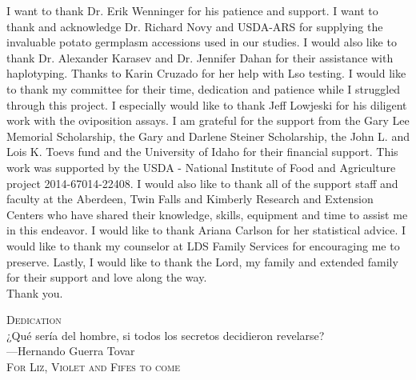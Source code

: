 \documentclass{UIdahoMastersThesis}
\begin{document}
	I want to thank Dr. Erik Wenninger for his patience and support. 
I want to thank and acknowledge Dr. Richard Novy and USDA-ARS for supplying the invaluable potato germplasm accessions used in our studies. I would also like to thank Dr. Alexander Karasev and Dr. Jennifer Dahan for their assistance with haplotyping. Thanks to Karin Cruzado for her help with Lso testing.  I would like to thank my committee for their time, dedication and patience while I struggled through this project. I especially would like to thank Jeff Lowjeski for his diligent work with the oviposition assays. I am grateful for the support from the Gary Lee Memorial Scholarship, the Gary and Darlene Steiner Scholarship, the John L. and Lois K. Toevs fund and the University of Idaho for their financial support. This work was supported by the USDA - National Institute of Food and Agriculture project 2014-67014-22408. I would also like to thank all of the support staff and faculty at the Aberdeen, Twin Falls and Kimberly Research and Extension Centers who have shared their knowledge, skills, equipment and time to assist me in this endeavor. I would like to thank Ariana Carlson for her statistical advice. I would like to thank my counselor at LDS Family Services for encouraging me to preserve. Lastly, I would like to thank the Lord, my family and extended family for their support and love along the way.\\
Thank you.
\newpage


 \vspace*{\fill}
 \begin{center}
   {\LARGE\textsc{Dedication}}\\[1em]

¿Qué sería del hombre, si todos los secretos decidieron revelarse?\\
---Hernando Guerra Tovar\\[2em]
\textsc{For Liz, Violet and Fifes to come}
 \end{center}
 \vspace{\fill}
 \newpage


\tableofcontents
\newpage


 \listoftables
 \newpage
\end{document}
